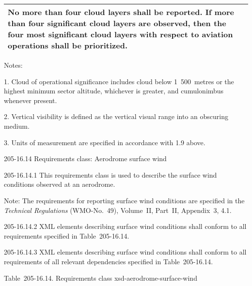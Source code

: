 \begin{longtable}[]{@{}ll@{}}
\begin{minipage}[t]{0.47\columnwidth}
No more than four cloud layers shall be reported. If more than four significant cloud layers are observed, then the four most significant cloud layers with respect to aviation operations shall be prioritized.\strut
\end{minipage}\tabularnewline
\bottomrule
\end{longtable}

Notes:

1. Cloud of operational significance includes cloud below 1~500~metres or the highest minimum sector altitude, whichever is greater, and cumulonimbus whenever present.

2. Vertical visibility is defined as the vertical visual range into an obscuring medium.

3. Units of measurement are specified in accordance with 1.9 above.

205-16.14 Requirements class: Aerodrome surface wind

205-16.14.1 This requirements class is used to describe the surface wind conditions observed at an aerodrome.

Note: The requirements for reporting surface wind conditions are specified in the \emph{Technical Regulations} (WMO-No.~49), Volume~II, Part~II, Appendix~3, 4.1.

205-16.14.2 XML elements describing surface wind conditions shall conform to all requirements specified in Table~205-16.14.

205-16.14.3 XML elements describing surface wind conditions shall conform to all requirements of all relevant dependencies specified in Table~205-16.14.

Table~205-16.14. Requirements class xsd-aerodrome-surface-wind

